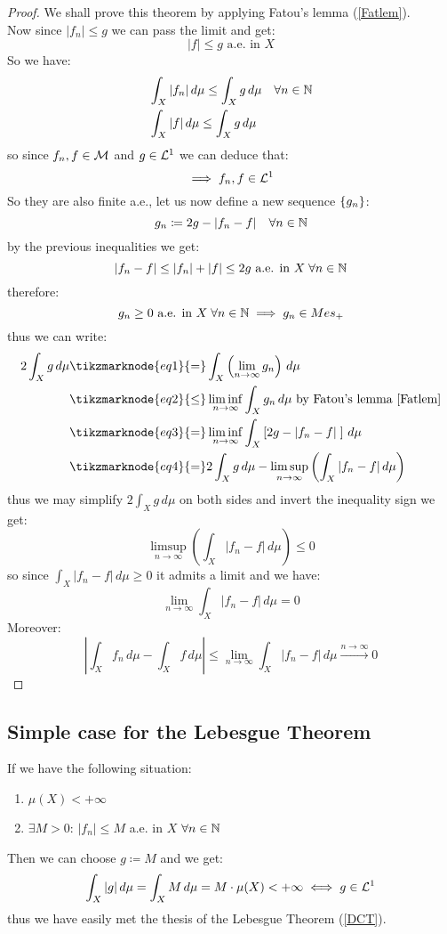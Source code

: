 \begin{proof}
    We shall prove this theorem by applying  Fatou's lemma (\ref{Fatlem}). \\
    Now since $|f_n| \leq g$ we can pass the limit and get:
    \[
        |f| \leq g \text{ a.e. in } X
    \]
    So we have:
    \begin{align*}
        & \int_X |f_n| \, d\mu \leq \int_X g \, d\mu \quad \forall n \in \mathbb{N} \\
        & \int_X |f| \, d\mu \leq \int_X g \, d\mu
    \end{align*}
    so since $f_n,f\in\mathcal{M}$ and $g\in\mathcal{L}^1$ we can deduce that:
    \[
        \implies f_n,f\in\mathcal{L}^1    
    \]
    So they are also finite a.e., let us now define  a new sequence $\{ g_n \}$:
    \[
        g_n \coloneqq 2g - |f_n -f | \quad \forall n \in \mathbb{N}  
    \]
    by the previous inequalities we get:
    \[
        |f_n -f | \leq |f_n| + |f|\leq 2g \text{ a.e. in } X \; \forall n \in \mathbb{N}    
    \]
    therefore:
    \[
        g_n \geq 0 \text{ a.e. in } X \; \forall n \in \mathbb{N} \implies g_n \in Mes_+    
    \]
    \newpage
    thus we can write:
    \begin{align*}
        2 \int_X g \, d\mu & \tikzmarknode{eq1}{=} \int_X \left( \lim_{n\to\infty} g_n \right) \, d\mu \\
        & \tikzmarknode{eq2}{\leq} \liminf_{n\to\infty} \int_X g_n \, d\mu  \text{ by Fatou's lemma \ref{Fatlem}}\\
        & \tikzmarknode{eq3}{=} \liminf_{n\to\infty} \int_X \left[ 2g - |f_n -f | \; \right] \, d\mu \\
        & \tikzmarknode{eq4}{=} 2 \int_X g \, d\mu - \limsup_{n\to\infty}  \left( \int_X |f_n-f| \, d\mu \right) \\
    \end{align*} 
    thus we may simplify $2\int_X g \, d\mu$ on both sides and invert the inequality sign we get:
    \[
        \limsup_{n\to\infty}  \left( \int_X |f_n-f| \, d\mu \right) \leq 0
    \]
    so since $\int_X |f_n-f| \, d\mu \geq 0$ it admits a limit and we have:
    \[
        \lim_{n\to\infty} \int_X |f_n-f| \, d\mu = 0
    \]
    Moreover:
    \[
        \left| \int_X f_n \, d\mu - \int_X f \, d\mu \right| \leq \lim_{n\to\infty} \int_X |f_n-f| \, d\mu  \xrightarrow{n\to\infty} 0
    \]
\end{proof}

\subsection{Simple case for the Lebesgue Theorem}
If we have the following situation:
\begin{enumerate}
    \item $\mu(X) < + \infty$ 
    \item $\exists M > 0$:  $| f_n | \leq M$ a.e. in $X$ $\forall n \in \mathbb{N}$
\end{enumerate}
Then we can choose $g\coloneqq M$ and we get:
\[
    \int_X |g| \, d\mu = \int_X M \, d\mu = M \cdot \mu(X) < +\infty \iff g\in\mathcal{L}^1    
\]
thus we have easily met the thesis of the Lebesgue Theorem (\ref{DCT}).

